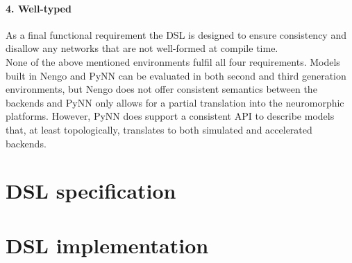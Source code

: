 \documentclass[report.tex]{subfiles}
\begin{document}
\paragraph{4. Well-typed}
As a final functional requirement the \gls{DSL} is designed to ensure
consistency and disallow any networks that are not well-formed at
compile time.
\\[0.4cm]
\noindent
None of the above mentioned environments fulfil all four requirements.
Models built in Nengo and PyNN can be evaluated
in both second and third generation environments, but Nengo does not 
offer consistent semantics between the backends and PyNN only allows
for a partial translation into the neuromorphic platforms.
However, PyNN does support a consistent \gls{API} to describe models that, at
least topologically, translates to both simulated and accelerated 
backends.

\section{DSL specification} \label{sec:volr}


\section{DSL implementation} \label{sec:implementation}

\end{document}
